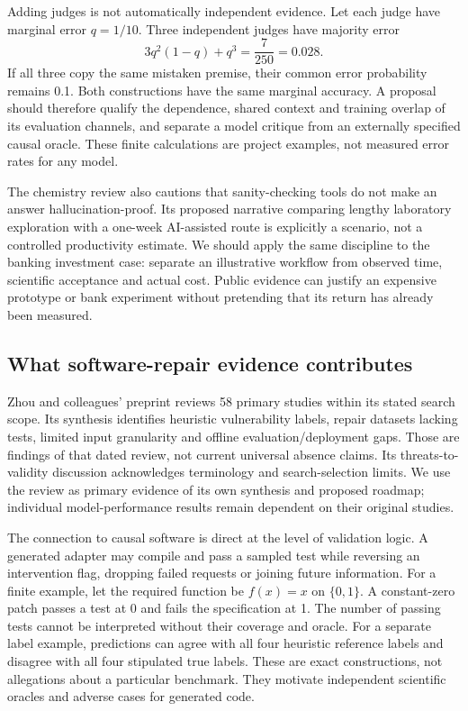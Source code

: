 Adding judges is not automatically independent evidence. Let each judge have marginal error $q=1/10$. Three independent judges have majority error
\[
 3q^2(1-q)+q^3=\frac{7}{250}=0.028.
\]
If all three copy the same mistaken premise, their common error probability remains 0.1. Both constructions have the same marginal accuracy. A proposal should therefore qualify the dependence, shared context and training overlap of its evaluation channels, and separate a model critique from an externally specified causal oracle. These finite calculations are project examples, not measured error rates for any model.\citep{exec25_cow_reference}

The chemistry review also cautions that sanity-checking tools do not make an answer hallucination-proof. Its proposed narrative comparing lengthy laboratory exploration with a one-week AI-assisted route is explicitly a scenario, not a controlled productivity estimate. We should apply the same discipline to the banking investment case: separate an illustrative workflow from observed time, scientific acceptance and actual cost. Public evidence can justify an expensive prototype or bank experiment without pretending that its return has already been measured.\citep{exec25_cow_chemistry,exec25_cow_reference}

\subsection{What software-repair evidence contributes}

Zhou and colleagues' preprint reviews 58 primary studies within its stated search scope. Its synthesis identifies heuristic vulnerability labels, repair datasets lacking tests, limited input granularity and offline evaluation/deployment gaps. Those are findings of that dated review, not current universal absence claims. Its threats-to-validity discussion acknowledges terminology and search-selection limits. We use the review as primary evidence of its own synthesis and proposed roadmap; individual model-performance results remain dependent on their original studies.\citep{exec25_cow_vulnerability}

The connection to causal software is direct at the level of validation logic. A generated adapter may compile and pass a sampled test while reversing an intervention flag, dropping failed requests or joining future information. For a finite example, let the required function be $f(x)=x$ on $\{0,1\}$. A constant-zero patch passes a test at 0 and fails the specification at 1. The number of passing tests cannot be interpreted without their coverage and oracle. For a separate label example, predictions can agree with all four heuristic reference labels and disagree with all four stipulated true labels. These are exact constructions, not allegations about a particular benchmark. They motivate independent scientific oracles and adverse cases for generated code.\citep{exec25_cow_reference}

